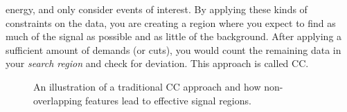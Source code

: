 energy, and only consider events of interest. By applying these kinds of constraints on the data, 
you are creating a region where you expect to find as much of the signal as possible and as little 
of the background. After applying a sufficient amount of demands (or cuts), you would count the 
remaining data in your \emph{search region} and check for deviation. This approach is called \ac{CC}.
\\
\begin{figure} 
    \centering
    \caption{An illustration of a traditional \ac{CC} approach and how non-overlapping features lead to effective
    signal regions.}
    \label{fig:overlap}
\end{figure}
